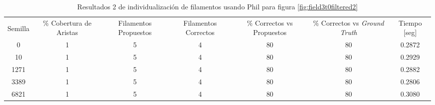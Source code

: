 \begin{table}[h]
    \centering
    \begin{tabular}{|c|c|c|c|c|c|c|}
    \hline
         & \multirow{4}{2cm}{\centering \% Cobertura de Aristas} & \multirow{4}{2cm}{Filamentos Propuestos} & \multirow{4}{2cm}{Filamentos Correctos} & \multirow{4}{2.5cm}{\% Correctos vs Propuestos} & \multirow{4}{2.5cm}{\centering \% Correctos vs {\it Ground Truth}} & \multirow{4}{1.2cm}{\centering Tiempo [seg]} \\
         &  &  &  & & &  \\
        Semilla &  &  &  & & &  \\
        &  &  &  & & &  \\ \hline 
        0 & 1 & 5 & 4 & 80 & 80 & 0.2872 \\
        10 & 1 & 5 & 4 & 80 & 80 & 0.2929\\
        1271 & 1 & 5 & 4 & 80 & 80 & 0.2882\\
        3389 & 1 & 5 & 4 & 80 & 80 & 0.2806\\
        6821 & 1 & 5 & 4 & 80 & 80 & 0.3080\\
        \hline
    \end{tabular}
    \caption{Resultados 2 de individualizaci\'on de filamentos usando Phil para figura \ref{fig:field3t0filtered2}}
    \label{tab:field3t0filtered2Results2}
\end{table}